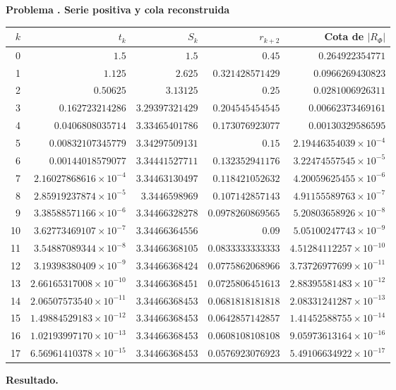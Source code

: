 \documentclass[11pt,a4paper]{article}
\theoremstyle{definition}
\newcounter{problema}
\newenvironment{resuelto}[1]{\refstepcounter{problema}\par\medskip\Needspace{6\baselineskip}\textbf{Problema \theproblema. #1}\par}{\par\medskip}
\begin{document}
\begin{resuelto}{Serie positiva y cola reconstruida}
\begin{center}\small\begin{tabular}{rrrrr}
\toprule
$k$&$t_k$&$S_k$&$r_{k+2}$&Cota de $|R_\Phi|$\\
\midrule
0&$1.5$&$1.5$&$0.45$&$0.264922354771$\\
1&$1.125$&$2.625$&$0.321428571429$&$0.0966269430823$\\
2&$0.50625$&$3.13125$&$0.25$&$0.0281006926311$\\
3&$0.162723214286$&$3.29397321429$&$0.204545454545$&$0.00662373469161$\\
4&$0.0406808035714$&$3.33465401786$&$0.173076923077$&$0.00130329586595$\\
5&$0.00832107345779$&$3.34297509131$&$0.15$&$2.19446354039\times10^{-4}$\\
6&$0.00144018579077$&$3.34441527711$&$0.132352941176$&$3.22474557545\times10^{-5}$\\
7&$2.16027868616\times10^{-4}$&$3.34463130497$&$0.118421052632$&$4.20059625455\times10^{-6}$\\
8&$2.85919237874\times10^{-5}$&$3.3446598969$&$0.107142857143$&$4.91155589763\times10^{-7}$\\
9&$3.38588571166\times10^{-6}$&$3.34466328278$&$0.0978260869565$&$5.20803658926\times10^{-8}$\\
10&$3.62773469107\times10^{-7}$&$3.34466364556$&$0.09$&$5.05100247743\times10^{-9}$\\
11&$3.54887089344\times10^{-8}$&$3.34466368105$&$0.0833333333333$&$4.51284112257\times10^{-10}$\\
12&$3.19398380409\times10^{-9}$&$3.34466368424$&$0.0775862068966$&$3.73726977699\times10^{-11}$\\
13&$2.66165317008\times10^{-10}$&$3.34466368451$&$0.0725806451613$&$2.88395581483\times10^{-12}$\\
14&$2.06507573540\times10^{-11}$&$3.34466368453$&$0.0681818181818$&$2.08331241287\times10^{-13}$\\
15&$1.49884529183\times10^{-12}$&$3.34466368453$&$0.0642857142857$&$1.41452588755\times10^{-14}$\\
16&$1.02193997170\times10^{-13}$&$3.34466368453$&$0.0608108108108$&$9.05973613164\times10^{-16}$\\
17&$6.56961410378\times10^{-15}$&$3.34466368453$&$0.0576923076923$&$5.49106634922\times10^{-17}$\\
\bottomrule\end{tabular}\end{center}
\textbf{Resultado.}
\[
\]
\end{resuelto}
\end{document}
